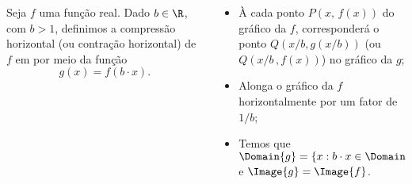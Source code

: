 \begin{frame}
  \begin{columns}[onlytextwidth]
    \begin{column}{0.49\textwidth}\vspace*{-0.5cm}
      \begin{definition}
        Seja $f$ uma função real. Dado $b\in\R$, com $b>1$, definimos a compressão horizontal (ou contração horizontal) de $f$ em por meio da função
        \begin{equation*}
          g(x) = f(b\cdot x).
        \end{equation*}
      \end{definition}
    \end{column}
    \begin{column}{0.49\textwidth}\vspace*{-0.6cm}
      \begin{itemize}
        \item À cada ponto $P(x,\,f(x))$ do gráfico da $f$, corresponderá o ponto $Q(x/b,g(x/b))$ (ou $Q\left(x/b\,,f(x)\right)$) no gráfico da $g$;
        \item Alonga o gráfico da $f$ horizontalmente por um fator de $1/b$;
        \item Temos que $\Domain{g} = \{x:b\cdot x\in\Domain{f}\}$ e $\Image{g}=\Image{f}$.
      \end{itemize}
    \end{column}
  \end{columns}
  \begin{figure}
  \end{figure}
\end{frame}
